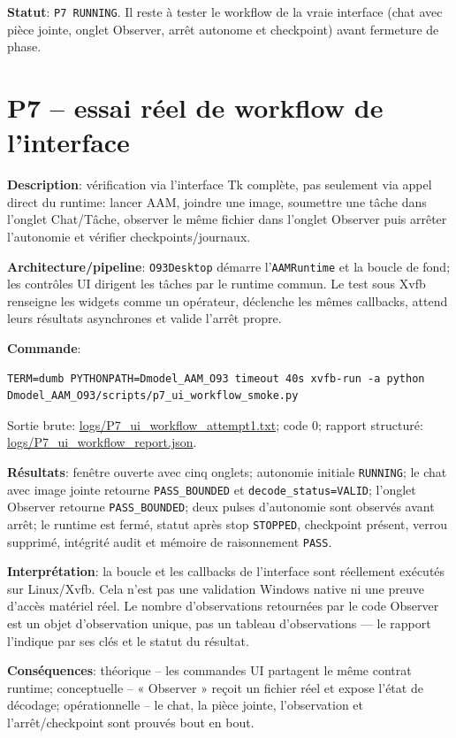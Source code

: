 \documentclass[11pt,a4paper,oneside]{report}
\begin{document}
\textbf{Statut}: \texttt{P7 RUNNING}. Il reste à tester le workflow de la vraie interface (chat avec pièce jointe, onglet Observer, arrêt autonome et checkpoint) avant fermeture de phase.


\section{P7 -- essai réel de workflow de l’interface}
\textbf{Description}: vérification via l’interface Tk complète, pas seulement via appel direct du runtime: lancer AAM, joindre une image, soumettre une tâche dans l’onglet Chat/Tâche, observer le même fichier dans l’onglet Observer puis arrêter l’autonomie et vérifier checkpoints/journaux.

\textbf{Architecture/pipeline}: \texttt{O93Desktop} démarre l’\texttt{AAMRuntime} et la boucle de fond; les contrôles UI dirigent les tâches par le runtime commun. Le test sous Xvfb renseigne les widgets comme un opérateur, déclenche les mêmes callbacks, attend leurs résultats asynchrones et valide l’arrêt propre.

\textbf{Commande}:
\begin{lstlisting}[basicstyle=\ttfamily\small,breaklines=true]
TERM=dumb PYTHONPATH=Dmodel_AAM_O93 timeout 40s xvfb-run -a python Dmodel_AAM_O93/scripts/p7_ui_workflow_smoke.py
\end{lstlisting}
Sortie brute: \url{logs/P7_ui_workflow_attempt1.txt}; code 0; rapport structuré: \url{logs/P7_ui_workflow_report.json}.

\textbf{Résultats}: fenêtre ouverte avec cinq onglets; autonomie initiale \texttt{RUNNING}; le chat avec image jointe retourne \texttt{PASS\_BOUNDED} et \texttt{decode\_status=VALID}; l’onglet Observer retourne \texttt{PASS\_BOUNDED}; deux pulses d’autonomie sont observés avant arrêt; le runtime est fermé, statut après stop \texttt{STOPPED}, checkpoint présent, verrou supprimé, intégrité audit et mémoire de raisonnement \texttt{PASS}.

\textbf{Interprétation}: la boucle et les callbacks de l’interface sont réellement exécutés sur Linux/Xvfb. Cela n’est pas une validation Windows native ni une preuve d’accès matériel réel. Le nombre d’observations retournées par le code Observer est un objet d’observation unique, pas un tableau d’observations — le rapport l’indique par ses clés et le statut du résultat.

\textbf{Conséquences}: théorique -- les commandes UI partagent le même contrat runtime; conceptuelle -- « Observer » reçoit un fichier réel et expose l’état de décodage; opérationnelle -- le chat, la pièce jointe, l’observation et l’arrêt/checkpoint sont prouvés bout en bout.
\end{document}
